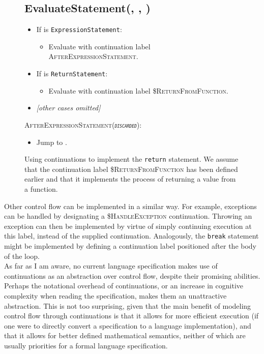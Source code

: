 \begin{figure}
  \subsection*{EvaluateStatement(, , )}
  \begin{itemize}
    \item If  is \texttt{ExpressionStatement}:
    \begin{itemize}
      \item Evaluate  with continuation label \textsc{AfterExpressionStatement}.
    \end{itemize}
    \item If  is \texttt{ReturnStatement}:
    \begin{itemize}
      \item Evaluate  with continuation label \textsc{\$ReturnFromFunction}.
    \end{itemize}
    \item \textit{[other cases omitted]}
  \end{itemize}
\textsc{AfterExpressionStatement(\textit{\texttt{discarded}}):}
  \begin{itemize}
    \item Jump to .
  \end{itemize}
  \caption{Using continuations to implement the \texttt{return} statement. We assume that the continuation label \textsc{\$ReturnFromFunction} has been defined earlier and that it implements the process of returning a value from a function.}
  \label{fig:continuation_early_return}
\end{figure}

Other control flow can be implemented in a similar way. For example, exceptions can be handled by designating a \textsc{\$HandleException} continuation. Throwing an exception can then be implemented by virtue of simply continuing execution at this label, instead of the supplied continuation. Analogously, the \texttt{break} statement might be implemented by defining a continuation label positioned after the body of the loop.\\

As far as I am aware, no current language specification makes use of continuations as an abstraction over control flow, despite their promising abilities. Perhaps the notational overhead of continuations, or an increase in cognitive complexity when reading the specification, makes them an unattractive abstraction. This is not too surprising, given that the main benefit of modeling control flow through continuations is that it allows for more efficient execution (if one were to directly convert a specification to a language implementation), and that it allows for better defined mathematical semantics, neither of which are usually priorities for a formal language specification. \\

